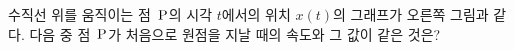 \noindent\begin{minipage}[t]{0.58\linewidth}\vspace{0pt}\raggedright 수직선 위를 움직이는 점~$\mathrm{P}$의 시각 $t$에서의 위치 $x(t)$의 그래프가 오른쪽 그림과 같다. 다음 중 점~$\mathrm{P}$가 처음으로 원점을 지날 때의 속도와 그 값이 같은 것은?\end{minipage}\hfill\begin{minipage}[t]{0.4\linewidth}\vspace{0pt}\centering \resizebox{\ifdim\width>\linewidth\linewidth\else\width\fi}{!}{}\end{minipage}\par
{}
